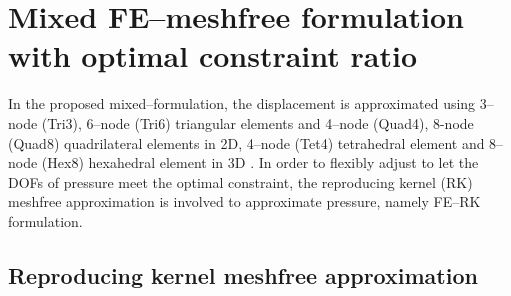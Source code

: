\section{Mixed FE--meshfree formulation with optimal constraint ratio}

In the proposed mixed--formulation, the displacement is approximated using 3--node (Tri3), 6--node (Tri6) triangular elements and 4--node (Quad4), 8-node (Quad8) quadrilateral elements in 2D, 4--node (Tet4) tetrahedral element and 8--node (Hex8) hexahedral element in 3D \cite{hughes2000}. In order to flexibly adjust to let the DOFs of pressure meet the optimal constraint, the reproducing kernel (RK) meshfree approximation is involved to approximate pressure, namely FE--RK formulation.

\subsection{Reproducing kernel meshfree approximation}\label{subsec:rk_approximation}

